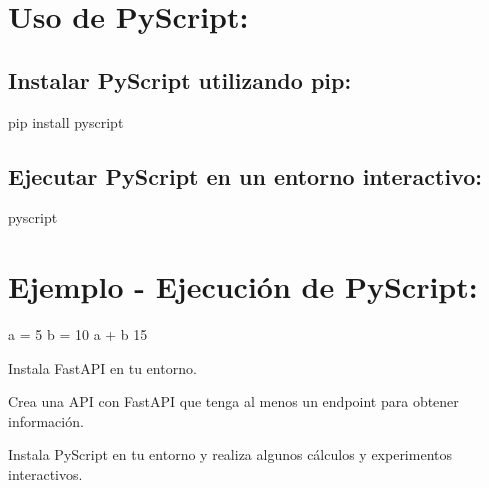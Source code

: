 \documentclass[
  a4paper,
  DIV=11,
  numbers=noendperiod,
  onepage,
  openany]{scrreprt}
\newenvironment{Shaded}{\begin{snugshade}}{\end{snugshade}}
\newcommand{\DecValTok}[1]{\textcolor[rgb]{0.68,0.00,0.00}{#1}}
\newcommand{\ExtensionTok}[1]{\textcolor[rgb]{0.00,0.23,0.31}{#1}}
\newcommand{\NormalTok}[1]{\textcolor[rgb]{0.00,0.23,0.31}{#1}}
\newcommand{\OperatorTok}[1]{\textcolor[rgb]{0.37,0.37,0.37}{#1}}
\begin{document}
\hypertarget{uso-de-pyscript}{%
\section{Uso de PyScript:}\label{uso-de-pyscript}}

\hypertarget{instalar-pyscript-utilizando-pip}{%
\subsection{Instalar PyScript utilizando
pip:}\label{instalar-pyscript-utilizando-pip}}

\begin{Shaded}
\begin{Highlighting}[]
\ExtensionTok{pip}\NormalTok{ install pyscript}
\end{Highlighting}
\end{Shaded}

\hypertarget{ejecutar-pyscript-en-un-entorno-interactivo}{%
\subsection{Ejecutar PyScript en un entorno
interactivo:}\label{ejecutar-pyscript-en-un-entorno-interactivo}}

\begin{Shaded}
\begin{Highlighting}[]
\ExtensionTok{pyscript}
\end{Highlighting}
\end{Shaded}

\hypertarget{ejemplo---ejecuciuxf3n-de-pyscript}{%
\section{Ejemplo - Ejecución de
PyScript:}\label{ejemplo---ejecuciuxf3n-de-pyscript}}

\begin{Shaded}
\begin{Highlighting}[]
\NormalTok{a }\OperatorTok{=} \DecValTok{5}
\NormalTok{b }\OperatorTok{=} \DecValTok{10}
\NormalTok{a }\OperatorTok{+}\NormalTok{ b}
\DecValTok{15}
\end{Highlighting}
\end{Shaded}

\begin{tcolorbox}[enhanced jigsaw, colbacktitle=quarto-callout-important-color!10!white, toprule=.15mm, leftrule=.75mm, titlerule=0mm, opacityback=0, rightrule=.15mm, opacitybacktitle=0.6, breakable, left=2mm, coltitle=black, title=\textcolor{quarto-callout-important-color}{\faExclamation}\hspace{0.5em}{Actividad Práctica:}, toptitle=1mm, bottomtitle=1mm, arc=.35mm, bottomrule=.15mm, colback=white, colframe=quarto-callout-important-color-frame]

Instala FastAPI en tu entorno.

Crea una API con FastAPI que tenga al menos un endpoint para obtener
información.

Instala PyScript en tu entorno y realiza algunos cálculos y experimentos
interactivos.

\end{tcolorbox}
\end{document}
